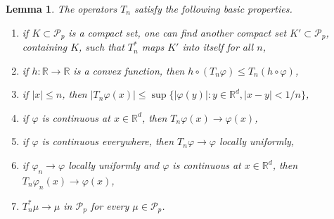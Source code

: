 \documentclass{article}
\newtheorem{lemma}[theorem]{Lemma}
\theoremstyle{definition}
\numberwithin{equation}{section}
\numberwithin{theorem}{section}
\newcommand{\R}{\mathbb{R}}
\newcommand{\Pcal}{{\mathcal P}}
\begin{document}
\begin{lemma}\label{L_Tn_prop}
The operators $T_n$ satisfy the following basic properties.
\begin{enumerate}
\item\label{L_Tn_prop_a1} if $K\subset\Pcal_p$ is a compact set, one can find another compact set $K'\subset\Pcal_p$, containing $K$, such that $T_n^*$ maps $K'$ into itself for all $n$,
\item\label{L_Tn_prop_a2} if $h\colon\R\to\R$ is a convex function, then $h \circ (T_n\varphi) \le T_n(h\circ\varphi)$,
\item\label{L_Tn_prop_0} if $|x|\le n$, then $|T_n\varphi(x)| \le \sup\{|\varphi(y)|\colon y\in {\R^d}, |x-y|<1/n\}$,
\item\label{L_Tn_prop_1} if $\varphi$ is continuous at $x\in {\R^d}$, then $T_n\varphi(x)\to\varphi(x)$,
\item\label{L_Tn_prop_2} if $\varphi$ is continuous everywhere, then $T_n\varphi\to\varphi$ locally uniformly,
\item\label{L_Tn_prop_3} if $\varphi_n\to\varphi$ locally uniformly and $\varphi$ is continuous at $x\in {\R^d}$, then $T_n\varphi_n(x)\to\varphi(x)$,
\item\label{L_Tn_prop_4} $T_n^*\mu \to \mu$ in $\Pcal_p$ for every $\mu\in\Pcal_p$.
\end{enumerate}
\end{lemma}
\end{document}
